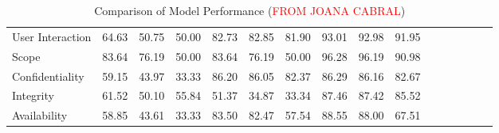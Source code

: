 \documentclass{article}
\begin{document}
\begin{table}[h!]
\begin{tabular}{|l|ccc|ccc|ccc|ccc|ccc|}
		User Interaction          & 64.63                     & 50.75                        & 50.00                           & 82.73                       & 82.85                       & 81.90 & 93.01 & 92.98 & 91.95 & \phantom{5}     & \phantom{5}     & \phantom{5}     & \phantom{5}     & \phantom{5}     & \phantom{5}     \\
		Scope                     & 83.64                     & 76.19                        & 50.00                           & 83.64                       & 76.19                       & 50.00 & 96.28 & 96.19 & 90.98 & \phantom{5}     & \phantom{5}     & \phantom{5}     & \phantom{5}     & \phantom{5}     & \phantom{5}     \\
		Confidentiality           & 59.15                     & 43.97                        & 33.33                           & 86.20                       & 86.05                       & 82.37 & 86.29 & 86.16 & 82.67 & \phantom{5}     & \phantom{5}     & \phantom{5}     & \phantom{5}     & \phantom{5}     & \phantom{5}     \\
		Integrity                 & 61.52                     & 50.10                        & 55.84                           & 51.37                       & 34.87                       & 33.34 & 87.46 & 87.42 & 85.52 & \phantom{5}     & \phantom{5}     & \phantom{5}     & \phantom{5}     & \phantom{5}     & \phantom{5}     \\
		Availability              & 58.85                     & 43.61                        & 33.33                           & 83.50                       & 82.47                       & 57.54 & 88.55 & 88.00 & 67.51 & \phantom{5}     & \phantom{5}     & \phantom{5}     & \phantom{5}     & \phantom{5}     & \phantom{5}     \\
		\hline
	\end{tabular}
	\caption{Comparison of Model Performance (\textcolor{red}{FROM JOANA CABRAL})}
	\label{tab:model_performance}
\end{table}
\end{document}
